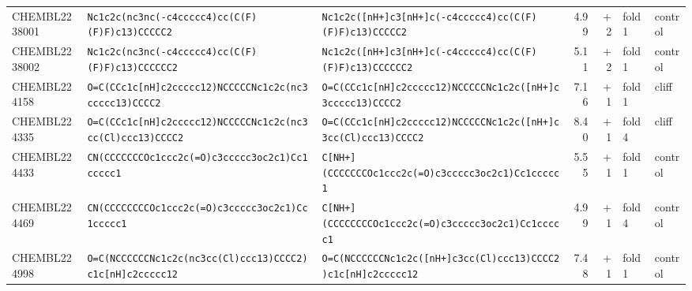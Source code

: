 \begin{longtable}{l p{4.4cm} p{4.4cm} r r l l}
CHEMBL2238001 & \texttt{Nc1c2c(\allowbreak{}nc3nc(\allowbreak{}-c4ccccc4)\allowbreak{}cc(\allowbreak{}C(\allowbreak{}F)\allowbreak{}(\allowbreak{}F)\allowbreak{}F)\allowbreak{}c13)\allowbreak{}CCCCC2} & \texttt{Nc1c2c(\allowbreak{}[nH+]\allowbreak{}c3[nH+]\allowbreak{}c(\allowbreak{}-c4ccccc4)\allowbreak{}cc(\allowbreak{}C(\allowbreak{}F)\allowbreak{}(\allowbreak{}F)\allowbreak{}F)\allowbreak{}c13)\allowbreak{}CCCCC2} & 4.99 & +2 & fold 1 & control \\
CHEMBL2238002 & \texttt{Nc1c2c(\allowbreak{}nc3nc(\allowbreak{}-c4ccccc4)\allowbreak{}cc(\allowbreak{}C(\allowbreak{}F)\allowbreak{}(\allowbreak{}F)\allowbreak{}F)\allowbreak{}c13)\allowbreak{}CCCCCC2} & \texttt{Nc1c2c(\allowbreak{}[nH+]\allowbreak{}c3[nH+]\allowbreak{}c(\allowbreak{}-c4ccccc4)\allowbreak{}cc(\allowbreak{}C(\allowbreak{}F)\allowbreak{}(\allowbreak{}F)\allowbreak{}F)\allowbreak{}c13)\allowbreak{}CCCCCC2} & 5.11 & +2 & fold 1 & control \\
CHEMBL224158 & \texttt{O=\allowbreak{}C(\allowbreak{}CCc1c[nH]\allowbreak{}c2ccccc12)\allowbreak{}NCCCCCNc1c2c(\allowbreak{}nc3ccccc13)\allowbreak{}CCCC2} & \texttt{O=\allowbreak{}C(\allowbreak{}CCc1c[nH]\allowbreak{}c2ccccc12)\allowbreak{}NCCCCCNc1c2c(\allowbreak{}[nH+]\allowbreak{}c3ccccc13)\allowbreak{}CCCC2} & 7.16 & +1 & fold 1 & cliff \\
CHEMBL224335 & \texttt{O=\allowbreak{}C(\allowbreak{}CCc1c[nH]\allowbreak{}c2ccccc12)\allowbreak{}NCCCCCNc1c2c(\allowbreak{}nc3cc(\allowbreak{}Cl)\allowbreak{}ccc13)\allowbreak{}CCCC2} & \texttt{O=\allowbreak{}C(\allowbreak{}CCc1c[nH]\allowbreak{}c2ccccc12)\allowbreak{}NCCCCCNc1c2c(\allowbreak{}[nH+]\allowbreak{}c3cc(\allowbreak{}Cl)\allowbreak{}ccc13)\allowbreak{}CCCC2} & 8.40 & +1 & fold 4 & cliff \\
CHEMBL224433 & \texttt{CN(\allowbreak{}CCCCCCCOc1ccc2c(\allowbreak{}=\allowbreak{}O)\allowbreak{}c3ccccc3oc2c1)\allowbreak{}Cc1ccccc1} & \texttt{C[NH+]\allowbreak{}(\allowbreak{}CCCCCCCOc1ccc2c(\allowbreak{}=\allowbreak{}O)\allowbreak{}c3ccccc3oc2c1)\allowbreak{}Cc1ccccc1} & 5.55 & +1 & fold 1 & control \\
CHEMBL224469 & \texttt{CN(\allowbreak{}CCCCCCCCOc1ccc2c(\allowbreak{}=\allowbreak{}O)\allowbreak{}c3ccccc3oc2c1)\allowbreak{}Cc1ccccc1} & \texttt{C[NH+]\allowbreak{}(\allowbreak{}CCCCCCCCOc1ccc2c(\allowbreak{}=\allowbreak{}O)\allowbreak{}c3ccccc3oc2c1)\allowbreak{}Cc1ccccc1} & 4.99 & +1 & fold 4 & control \\
CHEMBL224998 & \texttt{O=\allowbreak{}C(\allowbreak{}NCCCCCCNc1c2c(\allowbreak{}nc3cc(\allowbreak{}Cl)\allowbreak{}ccc13)\allowbreak{}CCCC2)\allowbreak{}c1c[nH]\allowbreak{}c2ccccc12} & \texttt{O=\allowbreak{}C(\allowbreak{}NCCCCCCNc1c2c(\allowbreak{}[nH+]\allowbreak{}c3cc(\allowbreak{}Cl)\allowbreak{}ccc13)\allowbreak{}CCCC2)\allowbreak{}c1c[nH]\allowbreak{}c2ccccc12} & 7.48 & +1 & fold 1 & control \\

\end{longtable}
